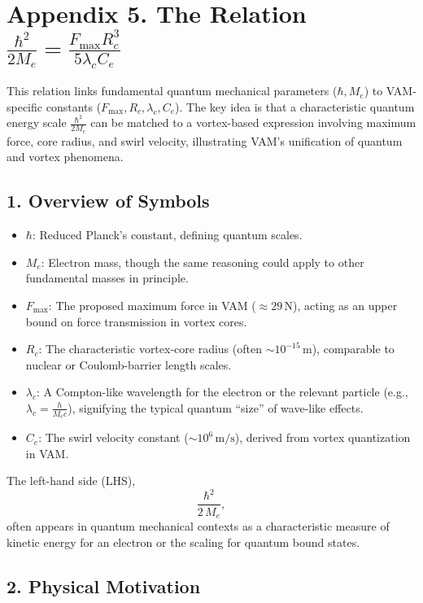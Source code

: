 

\section*{Appendix 5. The Relation \(\frac{\hbar^2}{2 M_e} = \frac{F_{\max} R_c^3}{5  \lambda_c  C_e} \)}

This relation links fundamental quantum mechanical parameters (\(\hbar, M_e\)) to VAM-specific constants (\(F_{\max}, R_c, \lambda_c, C_e\)). The key idea is that a characteristic quantum energy scale \(\tfrac{\hbar^2}{2M_e}\) can be matched to a vortex-based expression involving maximum force, core radius, and swirl velocity, illustrating VAM’s unification of quantum and vortex phenomena.

\subsection*{1. Overview of Symbols}

\begin{itemize}
    \item \(\hbar\): Reduced Planck’s constant, defining quantum scales.
    \item \(M_e\): Electron mass, though the same reasoning could apply to other fundamental masses in principle.
    \item \(F_{\max}\): The proposed maximum force in VAM (\(\approx 29\,\mathrm{N}\)), acting as an upper bound on force transmission in vortex cores.
    \item \(R_c\): The characteristic vortex-core radius (often \(\sim 10^{-15}\,\mathrm{m}\)), comparable to nuclear or Coulomb-barrier length scales.
    \item \(\lambda_c\): A Compton-like wavelength for the electron or the relevant particle (e.g., \(\lambda_c = \tfrac{h}{M_e c}\)), signifying the typical quantum “size” of wave-like effects.
    \item \(C_e\): The swirl velocity constant (\(\sim 10^6\,\mathrm{m/s}\)), derived from vortex quantization in VAM.
\end{itemize}

The left-hand side (LHS),
\[
    \frac{\hbar^2}{2\,M_e},
\]
often appears in quantum mechanical contexts as a characteristic measure of kinetic energy for an electron or the scaling for quantum bound states.

\subsection*{2. Physical Motivation}

